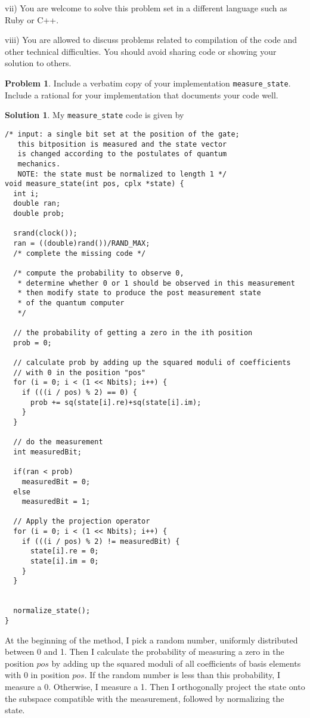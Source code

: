 \documentclass[12pt,a4paper]{article}
\theoremstyle{definition}
\newtheorem{problem}{Problem}
\newtheorem*{solution}{Solution}
\begin{document}
vii) You are welcome to solve this problem set in a different
language such as Ruby or C++. 

viii) You are allowed to discuss problems related to compilation of
the code and other technical difficulties. You should avoid sharing
code or showing your solution to others. 

\begin{problem}
Include a verbatim copy of your implementation \verb|measure_state|. 
Include a rational for your implementation that documents your code
well. 
\end{problem}
\begin{solution}
My \verb|measure_state| code is given by 
\begin{verbatim}
/* input: a single bit set at the position of the gate; 
   this bitposition is measured and the state vector  
   is changed according to the postulates of quantum 
   mechanics. 
   NOTE: the state must be normalized to length 1 */
void measure_state(int pos, cplx *state) { 
  int i;  
  double ran; 
  double prob; 
  
  srand(clock());
  ran = ((double)rand())/RAND_MAX;
  /* complete the missing code */ 

  /* compute the probability to observe 0,
   * determine whether 0 or 1 should be observed in this measurement
   * then modify state to produce the post measurement state 
   * of the quantum computer
   */ 

  // the probability of getting a zero in the ith position
  prob = 0;

  // calculate prob by adding up the squared moduli of coefficients
  // with 0 in the position "pos"
  for (i = 0; i < (1 << Nbits); i++) {
    if (((i / pos) % 2) == 0) {
      prob += sq(state[i].re)+sq(state[i].im);
    }
  }

  // do the measurement
  int measuredBit;

  if(ran < prob) 
    measuredBit = 0;
  else
    measuredBit = 1;
  
  // Apply the projection operator
  for (i = 0; i < (1 << Nbits); i++) {
    if (((i / pos) % 2) != measuredBit) {
      state[i].re = 0;
      state[i].im = 0;
    }
  }


  normalize_state();  
}
\end{verbatim}

At the beginning of the method, I pick a random number, uniformly distributed
between 0 and 1.  Then I calculate the probability of measuring a zero in the 
position $pos$ by adding up the squared moduli of all coefficients of basis
elements with 0 in position $pos$.  If the random number is less than this probability, 
I measure a 0.  Otherwise, I measure a 1.  Then I orthogonally project the state onto the 
subspace compatible with the measurement, followed by normalizing the state.
\end{solution}
\end{document}
